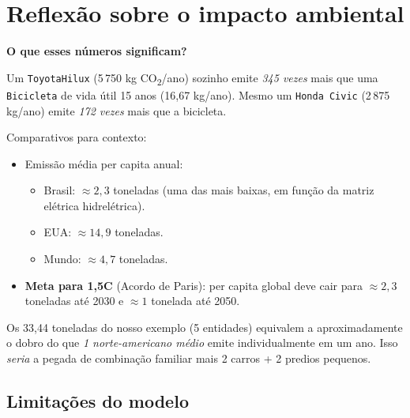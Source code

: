 \documentclass[11pt,a4paper]{article}
\begin{document}
\section{Reflex\~ao sobre o impacto ambiental}

\begin{reflexao}
\textbf{O que esses n\'umeros significam?}

\smallskip
Um \texttt{ToyotaHilux} (5\,750 kg CO\textsubscript{2}/ano) sozinho emite \emph{345 vezes} mais que uma \texttt{Bicicleta} de vida \'util 15 anos (16{,}67 kg/ano). Mesmo um \texttt{Honda Civic} (2\,875 kg/ano) emite \emph{172 vezes} mais que a bicicleta.

\smallskip
Comparativos para contexto:
\begin{itemize}[leftmargin=*,itemsep=0pt]
  \item Emiss\~ao m\'edia per capita anual:
    \begin{itemize}[itemsep=0pt]
      \item Brasil: $\approx 2{,}3$ toneladas (uma das mais baixas, em fun\c{c}\~ao da matriz el\'etrica hidrel\'etrica).
      \item EUA: $\approx 14{,}9$ toneladas.
      \item Mundo: $\approx 4{,}7$ toneladas.
    \end{itemize}
  \item \textbf{Meta para 1{,}5\textdegree C} (Acordo de Paris): per capita global deve cair para $\approx 2{,}3$ toneladas at\'e 2030 e $\approx 1$ tonelada at\'e 2050.
\end{itemize}

\smallskip
Os 33{,}44 toneladas do nosso exemplo (5 entidades) equivalem a aproximadamente o dobro do que \emph{1 norte-americano m\'edio} emite individualmente em um ano. Isso \emph{seria} a pegada de combina\c{c}\~ao familiar mais 2 carros + 2 predios pequenos.
\end{reflexao}

\subsection*{Limita\c{c}\~oes do modelo}
\end{document}
